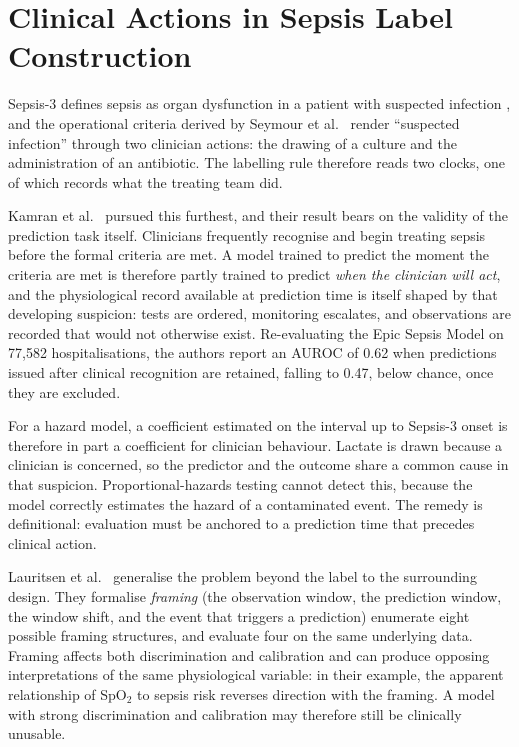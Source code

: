 \section{Clinical Actions in Sepsis Label Construction}
\label{sec:label_action}

Sepsis-3 defines sepsis as organ dysfunction in a patient with suspected
infection \cite{singer2016sepsis3}, and the operational criteria derived by
Seymour et al.\ \cite{seymour2016assessment} render ``suspected infection''
through two clinician actions: the drawing of a culture and the administration
of an antibiotic. The labelling rule therefore reads two clocks, one of which
records what the treating team did.

Kamran et al.\ \cite{kamran2024evaluation} pursued this furthest, and their
result bears on the validity of the prediction task itself. Clinicians frequently recognise
and begin treating sepsis before the formal criteria are met. A model trained
to predict the moment the criteria are met is therefore partly trained to
predict \emph{when the clinician will act}, and the physiological record
available at prediction time is itself shaped by that developing suspicion:
tests are ordered, monitoring escalates, and observations are recorded that
would not otherwise exist. Re-evaluating the Epic Sepsis Model on 77,582
hospitalisations, the authors report an AUROC of 0.62 when predictions issued
after clinical recognition are retained, falling to 0.47, below chance, once
they are excluded.

For a hazard model, a coefficient estimated on the interval up to Sepsis-3
onset is therefore in part a coefficient for clinician behaviour. Lactate is
drawn because a clinician is concerned, so the predictor and the outcome share
a common cause in that suspicion. Proportional-hazards testing cannot detect
this, because the model correctly estimates the hazard of a contaminated event.
The remedy is definitional: evaluation must be anchored to a prediction time
that precedes clinical action.

Lauritsen et al.\ \cite{lauritsen2021framing} generalise the problem beyond the
label to the surrounding design. They formalise \emph{framing} (the
observation window, the prediction window, the window shift, and the event that
triggers a prediction) enumerate eight possible framing structures, and
evaluate four on the same underlying data. Framing affects both
discrimination and calibration and can produce opposing interpretations of the
same physiological variable: in their example, the apparent relationship of
SpO$_2$ to sepsis risk reverses direction with the framing. A model with strong
discrimination and calibration may therefore still be clinically unusable.

